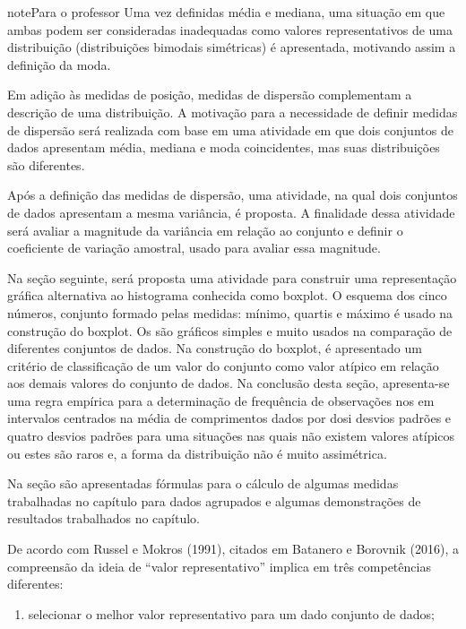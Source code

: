 \begin{sphinxadmonition}{note}{Para o professor}
Uma vez definidas média e mediana, uma situação em que ambas podem ser consideradas inadequadas como valores representativos de uma distribuição (distribuições bimodais simétricas) é apresentada, motivando assim a definição da moda.

Em adição às medidas de posição, medidas de dispersão complementam a descrição de uma distribuição. A motivação para a necessidade de definir medidas de dispersão será realizada com base em uma atividade em que dois conjuntos de dados apresentam média, mediana e moda coincidentes, mas suas distribuições são diferentes.

Após a definição das medidas de dispersão, uma atividade, na qual dois conjuntos de dados apresentam a mesma variância, é proposta. A finalidade dessa atividade será avaliar a magnitude da variância em relação ao conjunto e definir o coeficiente de variação amostral, usado para avaliar essa magnitude.

Na seção seguinte, será proposta uma atividade para construir uma representação gráfica alternativa ao histograma conhecida como boxplot. O esquema dos cinco números, conjunto formado pelas medidas: mínimo, quartis e máximo é usado na construção do boxplot. Os  são gráficos simples e muito usados na comparação de diferentes conjuntos de dados. Na construção do boxplot, é apresentado um critério de classificação de um valor do conjunto como valor atípico em relação aos demais valores do conjunto de dados. Na conclusão desta seção, apresenta-se uma regra empírica para a determinação de frequência de observações nos em intervalos centrados na média de comprimentos dados por dosi desvios padrões e quatro desvios padrões para uma situações nas quais não existem valores atípicos ou estes são raros e, a forma da distribuição não é muito assimétrica.

Na seção  são apresentadas fórmulas para o cálculo de algumas medidas trabalhadas no capítulo para dados agrupados e algumas demonstrações de resultados trabalhados no capítulo.


De acordo com Russel e Mokros (1991), citados em Batanero e Borovnik (2016), a compreensão da ideia de “valor representativo” implica em três competências diferentes:
\begin{enumerate}
\item {} 
selecionar o melhor valor representativo para um dado conjunto de dados;


\end{enumerate}
\end{sphinxadmonition}

